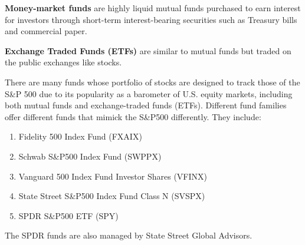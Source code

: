 \documentclass{article}
\begin{document}
      \begin{definition}
        \textbf{Money-market funds} are highly liquid mutual funds purchased to earn interest for investors through short-term interest-bearing securities such as Treasury bills and commercial paper. 
      \end{definition}

      \begin{definition}
        \textbf{Exchange Traded Funds (ETFs)} are similar to mutual funds but traded on the public exchanges like stocks. 
      \end{definition}

      \begin{example}[S\&P500 Funds]
        There are many funds whose portfolio of stocks are designed to track those of the S\&P 500 due to its popularity as a barometer of U.S. equity markets, including both mutual funds and exchange-traded funds (ETFs). Different fund families offer different funds that mimick the S\&P500 differently. They include: 
        \begin{enumerate}
          \item Fidelity 500 Index Fund (FXAIX)
          \item Schwab S\&P500 Index Fund (SWPPX)
          \item Vanguard 500 Index Fund Investor Shares (VFINX) 
          \item State Street S\&P500 Index Fund Class N (SVSPX)
          \item SPDR S\&P500 ETF (SPY)
        \end{enumerate}
        The SPDR funds are also managed by State Street Global Advisors. 
      \end{example}
\end{document}
